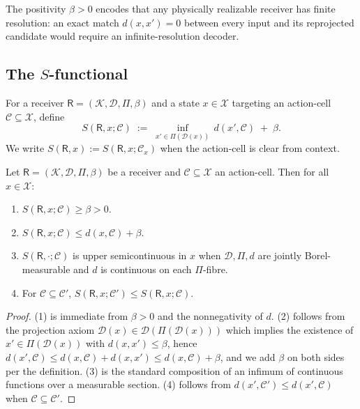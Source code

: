 \documentclass[twocolumn,11pt,a4paper]{article}
\newcommand{\K}{\mathcal{K}}
\newcommand{\D}{\mathcal{D}}
\newcommand{\X}{\mathcal{X}}
\newcommand{\Cell}{\mathcal{C}}
\newcommand{\receiver}{\mathsf{R}}
\begin{document}
\begin{remark}
The positivity $\beta>0$ encodes that any physically realizable receiver has
finite resolution: an exact match $d(x,x')=0$ between every input and its
reprojected candidate would require an infinite-resolution decoder.
\end{remark}

\subsection{The $S$-functional}

\begin{definition}[$S$-functional]\label{def:S}
For a receiver $\receiver=(\K,\D,\Pi,\beta)$ and a state $x\in\X$ targeting
an action-cell $\Cell\subseteq\X$, define
\[
S(\receiver,x;\Cell)\;:=\;\inf_{x'\in\Pi(\D(x))}\,d(x',\Cell)\;+\;\beta.
\]
We write $S(\receiver,x):=S(\receiver,x;\Cell_x)$ when the action-cell is
clear from context.
\end{definition}

\begin{proposition}\label{prop:basic-S}
Let $\receiver=(\K,\D,\Pi,\beta)$ be a receiver and $\Cell\subseteq\X$ an
action-cell. Then for all $x\in\X$:
\begin{enumerate}[label=(\arabic*),leftmargin=*]
\item $S(\receiver,x;\Cell)\ge\beta>0$.
\item $S(\receiver,x;\Cell)\le d(x,\Cell)+\beta$.
\item $S(\receiver,\cdot;\Cell)$ is upper semicontinuous in $x$ when
$\D,\Pi,d$ are jointly Borel-measurable and $d$ is continuous on each
$\Pi$-fibre.
\item For $\Cell\subseteq\Cell'$, $S(\receiver,x;\Cell')\le
S(\receiver,x;\Cell)$.
\end{enumerate}
\end{proposition}

\begin{proof}
(1) is immediate from $\beta>0$ and the nonnegativity of $d$. (2) follows
from the projection axiom $\D(x)\in\D(\Pi(\D(x)))$ which implies the
existence of $x'\in\Pi(\D(x))$ with $d(x,x')\le\beta$, hence
$d(x',\Cell)\le d(x,\Cell)+d(x,x')\le d(x,\Cell)+\beta$, and we add $\beta$
on both sides per the definition. (3) is the standard composition of an
infimum of continuous functions over a measurable section. (4) follows from
$d(x',\Cell')\le d(x',\Cell)$ when $\Cell\subseteq\Cell'$.
\end{proof}
\end{document}
